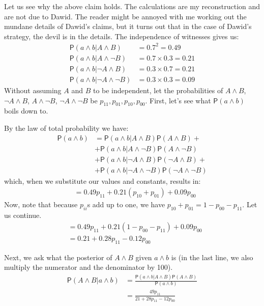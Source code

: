 \documentclass[10pt,dvipsnames,enabledeprecatedfontcommands]{scrartcl}
\newcommand{\n}{\neg}
\newcommand{\et}{\wedge}
\newcommand{\pr}[1]{\mathsf{P}(#1)}
\begin{document}
Let us see why the above claim holds. The calculations are my
reconstruction and are not due to Dawid. The reader might be annoyed
with me working out the mundane details of Dawid's claims, but it turns
out that in the case of Dawid's strategy, the devil is in the details.
The independence of witnesses gives us: \begin{align*}
 \pr{a \et b \vert A\et B}& =0.7^2=0.49\\
 \pr{a \et b \vert A\et \n B}& =  0.7\times 0.3=0.21\\
 \pr{a \et b \vert \n A\et B}& =  0.3\times 0.7=0.21\\
 \pr{a \et b \vert \n A\et \n B}& =  0.3\times 0.3=0.09
 \end{align*} Without assuming \(A\) and \(B\) to be independent, let
the probabilities of \(A\et B\), \(\n A\et B\), \(A\et \n B\),
\(\n A\et \n B\) be \(p_{11}, p_{01}, p_{10}, p_{00}\). First, let's see
what \(\pr{a\et b}\) boils down to.

By the law of total probability we have:
\begin{align}\label{eq:total_lower}
 \pr{a\et b} & = 
                     \pr{a\et b \vert A \et B}\pr{A\et B} + \\ &  \nonumber
                     +\pr{a\et b \vert A \et \n B}\pr{A\et \n B} \\ &  \nonumber
 + \pr{a\et b \vert \n A \et B}\pr{\n A\et B} + \\ & \nonumber
                     + \pr{a\et b \vert \n A \et \n B}\pr{\n A\et \n B}
 \end{align} \noindent which, when we substitute our values and
constants, results in: \begin{align*}
                     & = 0.49p_{11}+0.21(p_{10}+p_{01})+0.09p_{00}
 \end{align*} Now, note that because \(p_{ii}\)s add up to one, we have
\(p_{10}+p_{01}=1-p_{00}-p_{11}\). Let us continue. \begin{align*}
    & = 0.49p_{11}+0.21(1-p_{00}-p_{11})+0.09p_{00} \\
                     & = 0.21+0.28p_{11}-0.12p_{00}
 \end{align*}

Next, we ask what the posterior of \(A\et B\) given \(a\et b\) is (in
the last line, we also multiply the numerator and the denominator by
100). \begin{align*}
 \pr{A\et B\vert a \et b} & =
         \frac{\pr{a\et b \vert A \et B}\pr{A\et B}}
             {\pr{a\et b}}\\
         & =
                     \frac{49p_{11}}
                           {21+28p_{11}-12p_{00}} 
         \end{align*}
\end{document}
